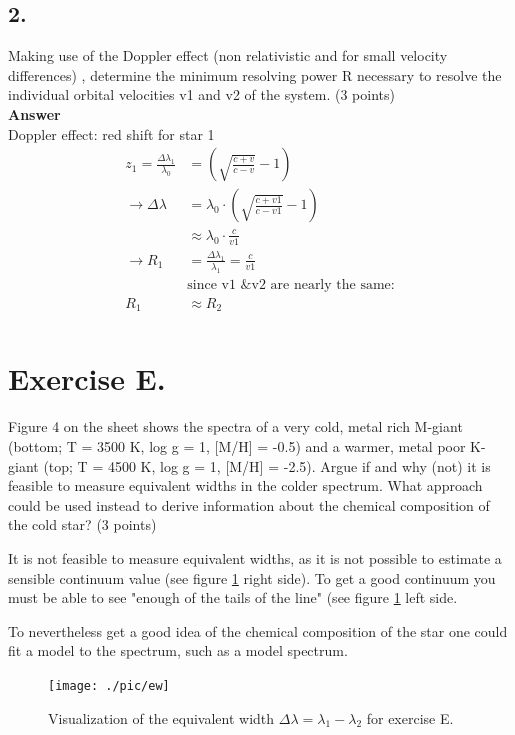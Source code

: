 \documentclass[11pt,a4paper,twoside]{article}
\begin{document}
\subsection*{2.} Making use of the Doppler effect (non relativistic and for small velocity differences) ,
determine the minimum resolving power R necessary to resolve the individual orbital
velocities v1 and v2 of the system. (3 points)\\
\textbf{Answer}\\
Doppler effect:
red shift for star 1
\begin{align*}
z_1=\frac{\Delta\lambda_1}{\lambda_0}&=\left(\sqrt{\frac{c+v}{c-v}}-1\right)\\
\rightarrow \Delta\lambda&=\lambda_0\cdot \left(\sqrt{\frac{c+v1}{c-v1}}-1\right)\\
&\approx\lambda_0\cdot \frac{c}{v1}\\
\rightarrow R_1&=\frac{\Delta\lambda_1}{\lambda_1}=\frac{c}{v1}\\
&\text{since v1 \& v2 are nearly the same:}\\
R_1 &\approx R_2\\
\end{align*}
\section*{Exercise E.}

Figure 4 on the sheet shows the spectra of a very cold, metal rich M-giant 
(bottom; T = 3500 K, log g = 1, [M/H] = -0.5) and a warmer, metal poor K-giant 
(top; T = 4500 K, log g = 1, [M/H] = -2.5). Argue if and why (not) it is 
feasible to measure equivalent widths in the colder spectrum. What approach 
could be used instead to derive information about the chemical composition of 
the cold star? (3 points)
\newline

It is not feasible to measure equivalent widths, as it is not possible to 
estimate a sensible continuum value (see figure \ref{fig:ew} right side). To
get a good continuum you must be able to see "enough of the tails of the 
line" (see figure \ref{fig:ew} left side.

To nevertheless get a good idea of the chemical composition of the star one 
could fit a model to the spectrum, such as a model spectrum.

\begin{figure}
\centering
\texttt{[image: ./pic/ew]}
\caption{Visualization of the equivalent width $\Delta\lambda = 
\lambda_1 - \lambda_2$ for exercise E.}
\label{fig:ew}
\end{figure}
\end{document}
